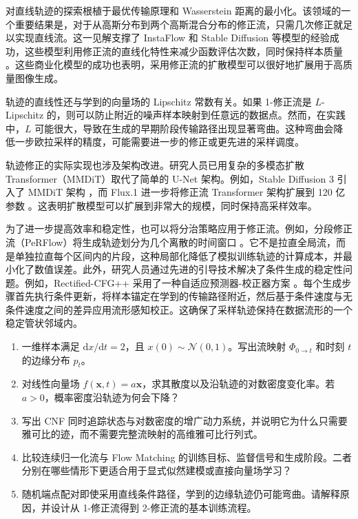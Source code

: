 \documentclass[UTF8,a4paper,zihao=-4,oneside,openany]{ctexbook}
\begin{document}
对直线轨迹的探索根植于最优传输原理和 Wasserstein 距离的最小化。该领域的一个重要结果是，对于从高斯分布到两个高斯混合分布的修正流，只需几次修正就足以实现直线流。这一见解支撑了 InstaFlow 和 Stable Diffusion 等模型的经验成功，这些模型利用修正流的直线化特性来减少函数评估次数，同时保持样本质量 \citep{esser-etal:2024scaling}。这些商业化模型的成功也表明，采用修正流的扩散模型可以很好地扩展用于高质量图像生成。

轨迹的直线性还与学到的向量场的 Lipschitz 常数有关。如果 1-修正流是 $L$-Lipschitz 的，则可以防止附近的噪声样本映射到任意远的数据点。然而，在实践中，$L$ 可能很大，导致在生成的早期阶段传输路径出现显著弯曲。这种弯曲会降低一步欧拉采样的精度，可能需要进一步的修正或更先进的采样调度。

轨迹修正的实际实现也涉及架构改进。研究人员已用复杂的多模态扩散 Transformer（MMDiT）取代了简单的 U-Net 架构。例如，Stable Diffusion 3 引入了 MMDiT 架构 \citep{esser-etal:2024scaling}，而 Flux.1 进一步将修正流 Transformer 架构扩展到 120 亿参数 \citep{greenberg-etal:2025demystifying}。这表明扩散模型可以扩展到非常大的规模，同时保持高采样效率。

为了进一步提高效率和稳定性，也可以将分治策略应用于修正流。例如，分段修正流（PeRFlow）将生成轨迹划分为几个离散的时间窗口 \citep{yan-etal:2024perflow}。它不是拉直全局流，而是单独拉直每个区间内的片段，这种局部化降低了模拟训练轨迹的计算成本，并最小化了数值误差。此外，研究人员通过先进的引导技术解决了条件生成的稳定性问题。例如，Rectified-CFG++ 采用了一种自适应预测器-校正器方案 \citep{saini-etal:2025rectified}。每个生成步骤首先执行条件更新，将样本锚定在学到的传输路径附近，然后基于条件速度与无条件速度之间的差异应用流形感知校正。这确保了采样轨迹保持在数据流形的一个稳定管状邻域内。

\begin{exercisebox}
  \begin{enumerate}
    \item 一维样本满足 \(\mathrm dx/\mathrm dt=2\)，且 \(x(0)\sim\mathcal N(0,1)\)。写出流映射 \(\Phi_{0\to t}\) 和时刻 \(t\) 的边缘分布 \(p_t\)。
    \item 对线性向量场 \(f(\boldsymbol x,t)=a\boldsymbol x\)，求其散度以及沿轨迹的对数密度变化率。若 \(a>0\)，概率密度沿轨迹为何会下降？
    \item 写出 CNF 同时追踪状态与对数密度的增广动力系统，并说明它为什么只需要雅可比的迹，而不需要完整流映射的高维雅可比行列式。
    \item 比较连续归一化流与 Flow Matching 的训练目标、监督信号和生成阶段。二者分别在哪些情形下更适合用于显式似然建模或直接向量场学习？
    \item 随机端点配对即使采用直线条件路径，学到的边缘轨迹仍可能弯曲。请解释原因，并设计从 1-修正流得到 2-修正流的基本训练流程。
  \end{enumerate}
\end{exercisebox}
\end{document}
